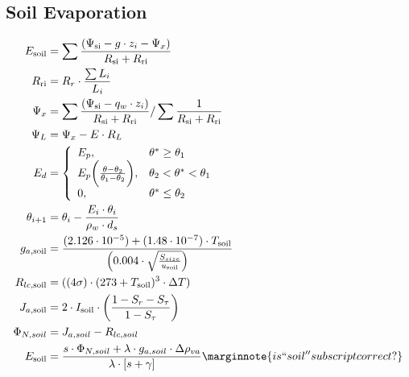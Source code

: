 \documentclass[10pt]{article}
\begin{document}

\subsection*{Soil Evaporation}

\begin{align}
 E_{\text{soil}} &= \sum \frac{(\Psi_{\text{si}} - g \cdot z_i - \Psi_x)}{R_{\text{si}}+R_{\text{ri}}} \label{eqn:Esoil} \\
 R_{\text{ri}} &= R_{r} \cdot \frac{\sum L_i}{L_i} \label{eqn:Rri} \\
 \Psi_x &= \sum \frac{(\Psi_{\text{si}}-q_w \cdot z_i)}{R_{\text{si}}+R_{\text{ri}}} / \sum \frac{1}{R_{\text{si}}+R_{\text{ri}}} \label{eqn:Psix} \\
 \Psi_L &= \Psi_x  - E \cdot R_L \hspace{3.2in} \label{eqn:PsiL}\\
 E_d &= \left\{ \begin{array}{ll}
        E_p , & \theta^{*} \geq \theta_1 \\
        E_p\biggl( \frac{\theta-\theta_2}{\theta_1 - \theta_2} \biggr), & \theta_2<\theta^*<\theta_1 \\
         0, & \theta^{*} \leq \theta_2 
                \end{array} \right. \label{eqn:Ed}\\
 \theta_{i+1} &= \theta_i - \frac{E_i \cdot \theta_i}{\rho_w \cdot d_s} \label{eqn:theta}\\
 g_{a,\text{soil}} &= \frac{(2.126 \cdot 10^{-5})+(1.48 \cdot 10^{-7}) \cdot T_{\text{soil}}}{\left(0.004 \cdot \sqrt{\frac{S_{size}}{u_{\text{soil}}}} \right)} \label{eqn:gasoil} \\
 R_{lc,\text{soil}} &= ((4 \sigma)\cdot(273 + T_{\text{soil}})^3 \cdot \Delta T) \label{eqn:Rlcsoil} \\
 J_{a,\text{soil}} &= 2 \cdot I_{\text{soil}} \cdot \biggl(\frac{1-S_r-S_{\tau}}{1-S_{\tau}}\biggr) \label{eqn:Jasoil} \\
 \Phi_{N,soil} &= J_{a,soil} - R_{lc,soil} \label{eqn:PhiNsoil} \\
 E_\text{soil} &= \frac{s \cdot \Phi_{N,soil} + \lambda \cdot g_{a,soil} \cdot \Delta \rho_{va}}{\lambda \cdot [s+\gamma]} \label{eqn:E2} \marginnote{is ``soil'' subscript correct?}
\end{align}
\end{document}
